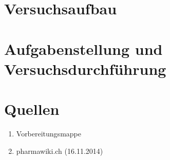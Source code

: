 \documentclass[a4paper,ngerman]{scrartcl}
\begin{document}
\section{Versuchsaufbau}








\section{Aufgabenstellung und Versuchsdurchführung}










\section{Quellen}
\begin{enumerate}
\item Vorbereitungsmappe \label{ref:mappe}
\item pharmawiki.ch (16.11.2014) \label{ref:pharmawiki}
\end{enumerate}
\end{document}
